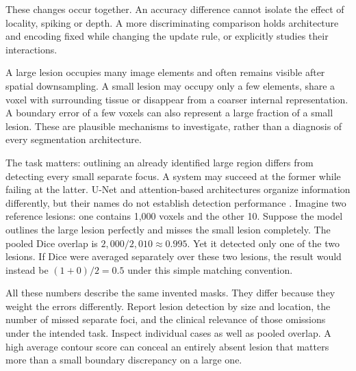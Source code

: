 These changes occur together. An accuracy difference cannot isolate the effect of locality, spiking or depth. A more discriminating comparison holds architecture and encoding fixed while changing the update rule, or explicitly studies their interactions.

\biomedicalanswer
{}
A large lesion occupies many image elements and often remains visible after spatial downsampling. A small lesion may occupy only a few elements, share a voxel with surrounding tissue or disappear from a coarser internal representation. A boundary error of a few voxels can also represent a large fraction of a small lesion. These are plausible mechanisms to investigate, rather than a diagnosis of every segmentation architecture.

The task matters: outlining an already identified large region differs from detecting every small separate focus. A system may succeed at the former while failing at the latter. U-Net and attention-based architectures organize information differently, but their names do not establish detection performance \citep{ronneberger2015,vaswani2017}.
Imagine two reference lesions: one contains 1,000 voxels and the other 10. Suppose the model outlines the large lesion perfectly and misses the small lesion completely. The pooled Dice overlap is $2,000/2,010\approx0.995$. Yet it detected only one of the two lesions. If Dice were averaged separately over these two lesions, the result would instead be $(1+0)/2=0.5$ under this simple matching convention.

All these numbers describe the same invented masks. They differ because they weight the errors differently.
Report lesion detection by size and location, the number of missed separate foci, and the clinical relevance of those omissions under the intended task. Inspect individual cases as well as pooled overlap. A high average contour score can conceal an entirely absent lesion that matters more than a small boundary discrepancy on a large one.

